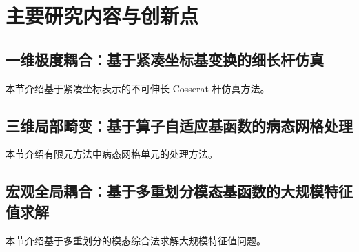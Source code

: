 
\section{主要研究内容与创新点}

\subsection{一维极度耦合：基于紧凑坐标基变换的细长杆仿真}

本节介绍基于紧凑坐标表示的不可伸长 Cosserat 杆仿真方法。

\subsection{三维局部畸变：基于算子自适应基函数的病态网格处理}

本节介绍有限元方法中病态网格单元的处理方法。

\subsection{宏观全局耦合：基于多重划分模态基函数的大规模特征值求解}

本节介绍基于多重划分的模态综合法求解大规模特征值问题。
